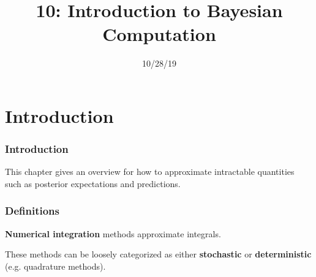\documentclass{beamer}
\title["10"]{10: Introduction to Bayesian Computation}
\date{10/28/19}
\begin{document}

\begin{frame}
\titlepage 
\end{frame}



\begin{frame}
\tableofcontents
\end{frame}

\section{Introduction}

\begin{frame}
\frametitle{Introduction}

This chapter gives an overview for how to approximate intractable quantities such as posterior expectations and predictions. 

\end{frame}

\begin{frame}
\frametitle{Definitions}

{\bf Numerical integration} methods approximate integrals. 
\newline

These methods can be loosely categorized as either {\bf stochastic} or {\bf deterministic} (e.g. quadrature methods).


\end{frame}
\end{document}
